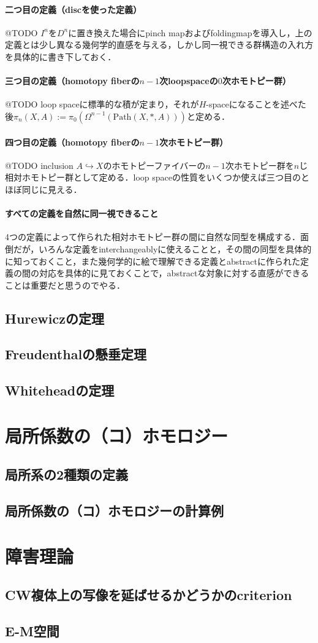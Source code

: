 \documentclass[a4paper,11pt]{jsarticle}
\begin{document}
\paragraph{二つ目の定義（discを使った定義）}@TODO $I^n$を$D^n$に置き換えた場合にpinch mapおよびfoldingmapを導入し，上の定義とは少し異なる幾何学的直感を与える，しかし同一視できる群構造の入れ方を具体的に書き下しておく．
\paragraph{三つ目の定義（homotopy fiberの$n-1$次loopspaceの$0$次ホモトピー群）}@TODO loop spaceに標準的な積が定まり，それが$H$-spaceになることを述べた後$\pi_n(X,A):=\pi_0(\Omega^{n-1}(\mathrm{Path}(X,{*},A)))$と定める．
\paragraph{四つ目の定義（homotopy fiberの$n-1$次ホモトピー群）}@TODO inclusion $A\hookrightarrow X$のホモトピーファイバーの$n-1$次ホモトピー群を$n$じ相対ホモトピー群として定める．loop spaceの性質をいくつか使えば三つ目のとほぼ同じに見える．
\paragraph{すべての定義を自然に同一視できること}4つの定義によって作られた相対ホモトピー群の間に自然な同型を構成する．面倒だが，いろんな定義をinterchangeablyに使えることと，その間の同型を具体的に知っておくこと，また幾何学的に絵で理解できる定義とabstractに作られた定義の間の対応を具体的に見ておくことで，abstractな対象に対する直感ができることは重要だと思うのでやる．
\subsection{Hurewiczの定理}
\subsection{Freudenthalの懸垂定理}
\subsection{Whiteheadの定理}
\section{局所係数の（コ）ホモロジー}
\subsection{局所系の2種類の定義}
\subsection{局所係数の（コ）ホモロジーの計算例}
\section{障害理論}
\subsection{CW複体上の写像を延ばせるかどうかのcriterion}
\subsection{E-M空間}

\printindex
\end{document}

